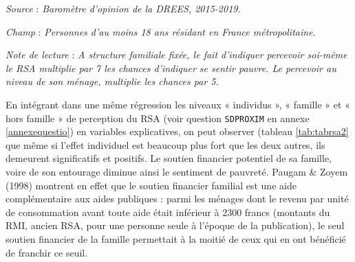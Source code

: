 \documentclass[12pt,a4paper]{reedthesis}
\begin{document}
\begin{table}
\emph{Source} : \emph{Baromètre d’opinion de la DREES, 2015-2019.}


\emph{Champ} : \emph{Personnes d’au moins 18 ans résidant en France métropolitaine.}


\emph{Note de lecture} : \emph{A structure familiale fixée, le fait d'indiquer percevoir soi-même le RSA multiplie par 7 les chances d'indiquer se sentir pauvre. Le percevoir au niveau de son ménage, multiplie les chances par 5.}
\normalsize\end{table}

En intégrant dans une même régression les niveaux « individus », « famille » et « hors famille » de perception du RSA (voir question \texttt{SDPROXIM} en annexe \ref{annexequestio}) en variables explicatives, on peut observer (tableau \ref{tab:tabrsa2} que même si l'effet individuel est beaucoup plus fort que les deux autres, ils demeurent significatifs et positifs. Le soutien financier potentiel de sa famille, voire de son entourage diminue ainsi le sentiment de pauvreté. Paugam \& Zoyem (1998) montrent en effet que le soutien financier familial est une aide complémentaire aux aides publiques : parmi les ménages dont le revenu par unité de consommation avant toute aide était inférieur à 2300 francs (montants du RMI, ancien RSA, pour une personne seule à l'époque de la publication), le seul soutien financier de la famille permettait à la moitié de ceux qui en ont bénéficié de franchir ce seuil.
\end{document}
